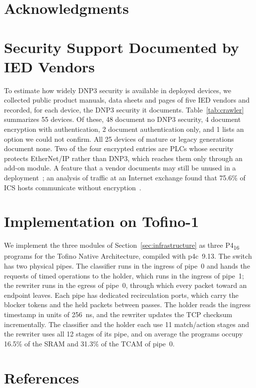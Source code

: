 \documentclass[conference]{IEEEtran}
\begin{document}
\section*{Acknowledgments}

\appendices
\section{Security Support Documented by IED Vendors}
\label{app:crawler}

To estimate how widely DNP3 security is available in deployed devices, we collected public product manuals, data sheets and pages of five IED vendors and recorded, for each device, the DNP3 security it documents. Table~\ref{tab:crawler} summarizes 55 devices. Of these, 48 document no DNP3 security, 4 document encryption with authentication, 2 document authentication only, and 1 lists an option we could not confirm. All 25 devices of mature or legacy generations document none. Two of the four encrypted entries are PLCs whose security protects EtherNet/IP rather than DNP3, which reaches them only through an add-on module. A feature that a vendor documents may still be unused in a deployment~\cite{CISA2026SecureOT}; an analysis of traffic at an Internet exchange found that 75.6\% of ICS hosts communicate without encryption~\cite{barbieri2021}.

\begin{table}[h]
\centering
\caption{DNP3 security support documented by five IED vendors (device counts): encryption with authentication, authentication only, an unconfirmed option, and none.}
\label{tab:crawler}
\footnotesize

\end{table}

\section{Implementation on Tofino-1}
\label{app:tofino}

We implement the three modules of Section~\ref{sec:infrastructure} as three P4\textsubscript{16} programs for the Tofino Native Architecture, compiled with p4c~9.13. The switch has two physical pipes. The classifier runs in the ingress of pipe~0 and hands the requests of timed operations to the holder, which runs in the ingress of pipe~1; the rewriter runs in the egress of pipe~0, through which every packet toward an endpoint leaves. Each pipe has dedicated recirculation ports, which carry the blocker tokens and the held packets between passes. The holder reads the ingress timestamp in units of 256~ns, and the rewriter updates the TCP checksum incrementally. The classifier and the holder each use 11 match/action stages and the rewriter uses all 12 stages of its pipe, and on average the programs occupy 16.5\% of the SRAM and 31.3\% of the TCAM of pipe~0.

\section*{References}


\end{document}
